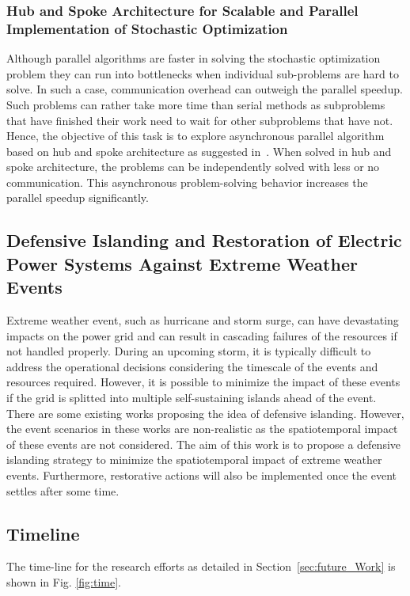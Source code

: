 \subsubsection{Hub and Spoke Architecture for Scalable and Parallel Implementation of Stochastic Optimization}
Although parallel algorithms are faster in solving the stochastic optimization problem they can run into bottlenecks when individual sub-problems are hard to solve. In such a case, communication overhead can outweigh the parallel speedup. Such problems can rather take more time than serial methods as subproblems that have finished their work need to wait for other subproblems that have not. Hence, the objective of this task is to explore asynchronous parallel algorithm based on hub and spoke architecture as suggested in~\cite{knueven2020parallel}. When solved in hub and spoke architecture, the problems can be independently solved with less or no communication. This asynchronous problem-solving behavior increases the parallel speedup significantly. 

\subsection{Defensive Islanding and Restoration of Electric Power Systems Against Extreme Weather Events}
Extreme weather event, such as hurricane and storm surge, can have devastating impacts on the power grid and can result in cascading failures of the resources if not handled properly. During an upcoming storm, it is typically difficult to address the operational decisions considering the timescale of the events and resources required. However, it is possible to minimize the impact of these events if the grid is splitted into multiple self-sustaining islands ahead of the event. There are some existing works proposing the idea of defensive islanding. However, the event scenarios in these works are non-realistic as the spatiotemporal impact of these events are not considered. The aim of this work is to propose a defensive islanding strategy to minimize the spatiotemporal impact of extreme weather events. Furthermore, restorative actions will also be implemented once the event settles after some time.    

\clearpage
\subsection{Timeline}
The time-line for the research efforts as detailed in Section~\ref{sec:future_Work} is shown in Fig. \ref{fig:time}.

